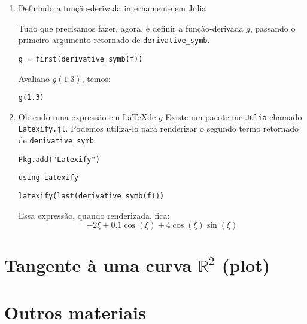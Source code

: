 \documentclass[12pt]{article}
\begin{document}
\begin{enumerate}
\item Definindo a função-derivada internamente em Julia
\label{sec:org3664dd4}

Tudo que precisamos fazer, agora, é definir a função-derivada \(g\),
passando o primeiro argumento retornado de \texttt{derivative\_symb}.

\begin{verbatim}
g = first(derivative_symb(f))
\end{verbatim}

Avaliano \(g(1.3)\), temos:

\begin{verbatim}
g(1.3)
\end{verbatim}

\item Obtendo uma expressão em \LaTeX de \(g\)
\label{sec:org847f6ab}
Existe um pacote me \texttt{Julia} chamado \texttt{Latexify.jl}. Podemos utilizá-lo
para renderizar o segundo termo retornado de \texttt{derivative\_symb}.

\begin{verbatim}
Pkg.add("Latexify")
\end{verbatim}


\begin{verbatim}
using Latexify
\end{verbatim}

\begin{verbatim}
latexify(last(derivative_symb(f)))
\end{verbatim}

Essa expressão, quando renderizada, fica:
\begin{equation}
 - 2 \xi + 0.1 \cos\left( \xi \right) + 4 \cos\left( \xi \right) \sin\left( \xi \right)
\end{equation}
\end{enumerate}

\section{Tangente à uma curva \(\mathbb{R}^2\) (plot)}
\label{sec:orgd4dba6e}
\section{Outros materiais}
\label{sec:org6fcca4e}
\end{document}
